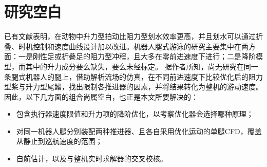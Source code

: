 \section{研究空白}
\label{sec:rw-gap}

已有文献表明，在动物中升力型拍动比阻力型划水效率更高，并且划水可以通过折叠、时机控制和速度曲线设计加以改进。机器人腿式游泳的研究主要集中在两方面：一是刚性足或折叠足的阻力型冲程，且大多在零前进速度下进行\cite{Wang2025,Qu2025}；二是降阶模型，而其中的升力成分要么缺失，要么未经标定。
据作者所知，尚无研究在同一条腿式机器人的腿上，借助解析流场的仿真，在不同前进速度下比较优化后的阻力型桨与升力型尾鳍，找出限制各推进器的因素，并将结果转化为整机的游动速度。因此，以下几方面的组合尚属空白，也正是本文所要解决的：
\begin{itemize}
  \item 包含执行器速度限值和升力项的降阶优化，以考察优化器会选择哪种原理；
  \item 对同一机器人腿分别装配两种推进器、且各自采用优化运动的单腿CFD，覆盖从静止到巡航速度的范围；
  \item 自航估计，以及与整机实时求解器的交叉校核。
\end{itemize}

